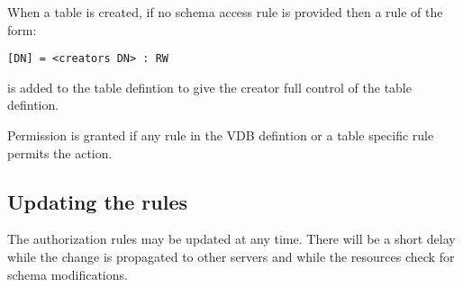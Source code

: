 When a table is created, if no schema access rule is provided then a rule of the form:
\begin{verbatim}
[DN] = <creators DN> : RW 
\end{verbatim}
is added to the table defintion to give the creator full control of the table
defintion.

Permission is granted if any rule in the VDB defintion or a table specific rule
permits the action.

\subsection{Updating the rules}
The authorization rules may be updated at any time. There will be a short delay
while the change is propagated to other servers and while the resources check
for schema modifications.
